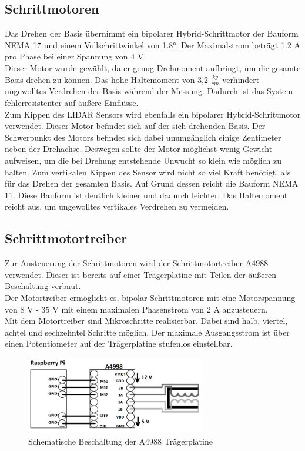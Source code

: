 \subsection{Schrittmotoren}
Das Drehen der Basis übernimmt ein bipolarer Hybrid-Schrittmotor der Bauform \ac{NEMA} 17 und einem Vollschrittwinkel von 1.8°. Der Maximalstrom beträgt 1.2 A pro Phase bei einer Spannung von 4 V.\\ 
Dieser Motor wurde gewählt, da er genug Drehmoment aufbringt, um die gesamte Basis drehen zu können. Das hohe Haltemoment von 3,2 $\frac{kg}{cm}$ verhindert ungewolltes Verdrehen der Basis während der Messung. Dadurch ist das System fehlerresistenter auf äußere Einflüsse. \cite{NEMA17}\\
Zum Kippen des \ac{LIDAR} Sensors wird ebenfalls ein bipolarer Hybrid-Schrittmotor verwendet. Dieser Motor befindet sich auf der sich drehenden Basis. Der Schwerpunkt des Motors befindet sich dabei unumgänglich einige Zentimeter neben der Drehachse. Deswegen sollte der Motor möglichst wenig Gewicht aufweisen, um die bei Drehung entstehende Unwucht so klein wie möglich zu halten.
Zum vertikalen Kippen des Sensor wird nicht so viel Kraft benötigt, als für das Drehen der gesamten Basis. Auf Grund dessen reicht die Bauform \ac{NEMA} 11. Diese Bauform ist deutlich kleiner und dadurch leichter.
Das Haltemoment reicht aus, um ungewolltes vertikales Verdrehen zu vermeiden.


\subsection{Schrittmotortreiber} \label{sec:Schrittmotortreiber}
Zur Ansteuerung der Schrittmotoren wird der Schrittmotortreiber A4988 verwendet. Dieser ist bereits auf einer Trägerplatine mit Teilen der äußeren Beschaltung verbaut.\\
Der Motortreiber ermöglicht es, bipolar Schrittmotoren mit eine Motorspannung von 8 V - 35 V mit einem maximalen Phasenstrom von 2 A anzusteuern. \cite{A4988}\\ 
Mit dem Motortreiber sind Mikroschritte realisierbar. Dabei sind halb, viertel, achtel und sechzehntel Schritte möglich. Der maximale Ausgangsstrom ist über einen Potentiometer auf der Trägerplatine stufenlos einstellbar. 

\begin{figure}[H] 
	\centering 
	\includegraphics[width=0.7\textwidth]{images/Hardware/A4988} 
	\caption{Schematische Beschaltung der A4988 Trägerplatine} 
	\label{A4988} 
\end{figure} 




